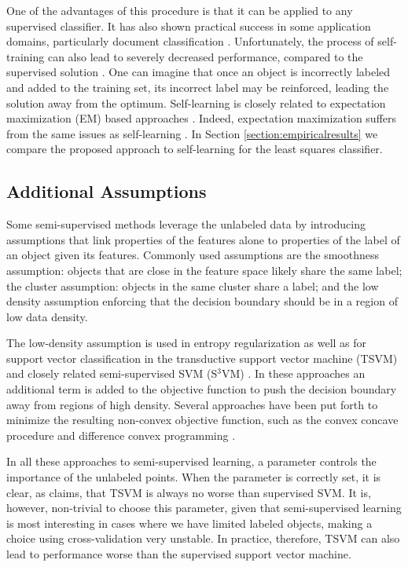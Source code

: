 \documentclass{elsarticle}
\begin{document}
One of the advantages of this procedure is that it can be applied to any supervised classifier.
It has also shown practical success in some application domains, particularly document classification \cite{Nigam2000,Yarowsky1995}.
Unfortunately, the process of self-training can also lead to severely decreased performance, compared to the supervised solution \cite{Cozman2006,Cozman2003}. 
One can imagine that once an object is incorrectly labeled and added to the training set, its incorrect label may be reinforced, leading the solution away from the optimum. 
Self-learning is closely related to expectation maximization (EM) based approaches \cite{Abney2004}. Indeed, expectation maximization suffers from the same issues as self-learning \cite{Zhu2009}.
In Section \ref{section:empiricalresults} we compare the proposed approach to self-learning for the least squares classifier.

\subsection*{Additional Assumptions}
Some semi-supervised methods leverage the unlabeled data by introducing assumptions that link properties of the features alone to properties of the label of an object given its features. Commonly used assumptions are the smoothness assumption: objects that are close in the feature space likely share the same label; the cluster assumption: objects in the same cluster share a label; and the low density assumption enforcing that the decision boundary should be in a region of low data density. 

The low-density assumption is used in entropy regularization \cite{Grandvalet2005} as well as for support vector classification in the transductive support vector machine (TSVM)  \cite{Joachims1999} and closely related semi-supervised SVM (S$^3$VM) \cite{Bennett1998,Sindhwani2006}. 
In these approaches an additional term is added to the objective function to push the decision boundary away from regions of high density. 
Several approaches have been put forth to minimize the resulting non-convex objective function, such as the convex concave procedure \cite{Collobert2006} and difference convex programming \cite{Sindhwani2006,Wang2007}.

In all these approaches to semi-supervised learning, a parameter controls the importance of the unlabeled points. When the parameter is correctly set, it is clear, as \cite{Wang2007a} claims, that TSVM is always no worse than supervised SVM. 
It is, however, non-trivial to choose this parameter, given that semi-supervised learning is most interesting in cases where we have limited labeled objects, making a choice using cross-validation very unstable. 
In practice, therefore, TSVM can also lead to performance worse than the supervised support vector machine. 
\end{document}
